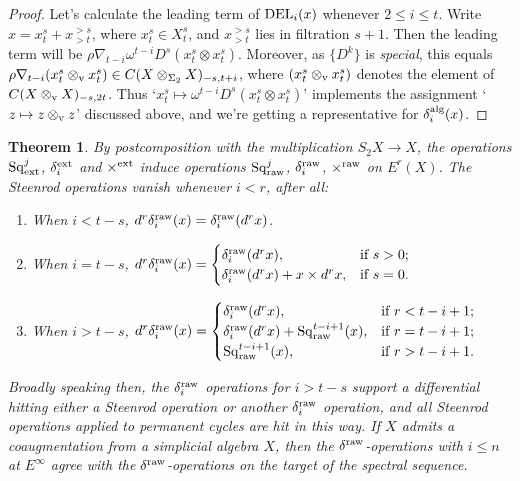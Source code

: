 \documentclass[11pt]{amsart}
\theoremstyle{plain}
\newtheorem{thm}{Theorem}[section]
\theoremstyle{definition}
\renewcommand{\to}{\longrightarrow}
\newcommand{\squishlist}{
  \setlength{\itemsep}{.5pt}
  \setlength{\parskip}{0pt}
  \setlength{\parsep}{0pt}}
\theoremstyle{plain}
\newcommand{\twist}{\omega}
\newcommand{\Nabla}{\nabla}
\newcommand{\Sq}{\mathrm{Sq}}
\begin{document}
\begin{second quadrant homotopy}
\begin{proof}
Let's calculate the leading term of $\textup{DEL}_{i}(x)$ whenever $2\leq i\leq t$. Write $x=x^s_t+x^{>s}_{>t}$, where $x^s_t\in X^s_t$, and $x^{>s}_{>t}$ lies in filtration $s+1$. Then the leading term will be $\rho\Nabla_{t-i}\twist^{t-i}D^s (x^s_t\otimes x^s_t)$. Moreover, as $\{D^k\}$ is \emph{special}, this equals $\rho{\Nabla}_{t-i}(x^s_t\otimes_\textup{v} x^s_t)\in C(X\otimes_{\Sigma_2} X)_{-s,t+i}$, where $(x^s_t\otimes_\textup{v} x^s_t)$ denotes the element of $C(X\otimes_\textup{v}X)_{-s,2t}$. Thus `$x^s_t\mapsto \twist^{t-i}D^s(x^s_t\otimes x^s_t)$' implements the assignment `$z\mapsto z\otimes_\textup{v} z$' discussed above, and we're getting a representative for $\delta^\textup{alg}_i(x)$.
\end{proof}




\begin{thm}
By postcomposition with the multiplication $S_2X\to X$, the operations $\Sq^j_\textup{ext}$, $\delta_i^\textup{ext}$ and $\times^\textup{ext}$ induce operations $\Sq^j_\textup{raw}$, $\delta_i^\textup{raw}$, $\times^\textup{raw}$ on $E^r(X)$. The Steenrod operations vanish whenever $i<r$, after all:
\begin{enumerate}\squishlist
\setlength{\parindent}{.25in}
\item When $i<t-s$, $d^r\delta^\textup{raw}_i(x)=\delta^\textup{raw}_i(d^rx)$.
\item When $i=t-s$, $d^r\delta^\textup{raw}_i(x)=\begin{cases}
\delta^\textup{raw}_i(d^rx),&\textup{if }s>0;\\
\delta^\textup{raw}_i(d^rx)+x\times d^rx,&\textup{if }s=0.
\end{cases}$
\item When $i>t-s$, $d^r\delta^\textup{raw}_i(x)=\begin{cases}
\delta^\textup{raw}_i(d^rx),&\textup{if }r<t-i+1;\\
\delta^\textup{raw}_i(d^rx)+\Sq_\textup{raw}^{t-i+1}(x),&\textup{if }r=t-i+1;\\
\Sq_\textup{raw}^{t-i+1}(x),&\textup{if }r>t-i+1.\\
\end{cases}$
\end{enumerate}
Broadly speaking then, the $\delta^\textup{raw}_i$ operations for $i>t-s$ support a differential hitting either a Steenrod operation or another $\delta^\textup{raw}_i$ operation, and all Steenrod operations applied to permanent cycles are hit in this way. If $X$ admits a coaugmentation from a simplicial algebra $X$, then the $\delta^\textup{raw}$-operations with $i\leq n$ at $E^\infty$ agree with the $\delta^\textup{raw}$-operations on the target of the spectral sequence.


\end{thm}
\end{second quadrant homotopy}
\end{document}
